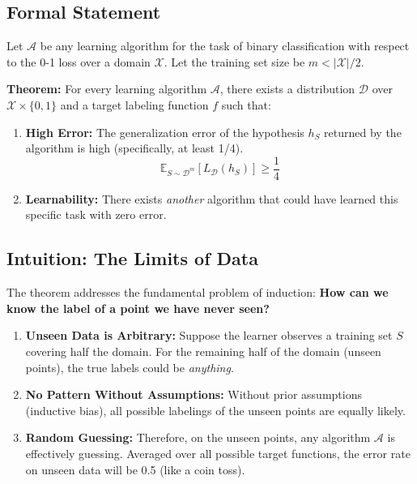 \documentclass[
  italian,
  11pt,
]{article}
\providecommand{\tightlist}{%
  \setlength{\itemsep}{0pt}\setlength{\parskip}{0pt}}
\begin{document}
\subsection{Formal Statement}\label{formal-statement}

Let \(\mathcal{A}\) be any learning algorithm for the task of binary
classification with respect to the 0-1 loss over a domain
\(\mathcal{X}\). Let the training set size be \(m < |\mathcal{X}|/2\).

\textbf{Theorem:} For every learning algorithm \(\mathcal{A}\), there
exists a distribution \(\mathcal{D}\) over
\(\mathcal{X} \times \{0,1\}\) and a target labeling function \(f\) such
that:

\begin{enumerate}
\def\labelenumi{\arabic{enumi}.}
\tightlist
\item
  \textbf{High Error:} The generalization error of the hypothesis
  \(h_S\) returned by the algorithm is high (specifically, at least
  1/4).
  \[ \mathbb{E}_{S \sim \mathcal{D}^m} [L_{\mathcal{D}}(h_S)] \geq \frac{1}{4} \]
\item
  \textbf{Learnability:} There exists \emph{another} algorithm that
  could have learned this specific task with zero error.
\end{enumerate}

\subsection{Intuition: The Limits of
Data}\label{intuition-the-limits-of-data}

The theorem addresses the fundamental problem of induction: \textbf{How
can we know the label of a point we have never seen?}

\begin{enumerate}
\def\labelenumi{\arabic{enumi}.}
\tightlist
\item
  \textbf{Unseen Data is Arbitrary:} Suppose the learner observes a
  training set \(S\) covering half the domain. For the remaining half of
  the domain (unseen points), the true labels could be \emph{anything}.
\item
  \textbf{No Pattern Without Assumptions:} Without prior assumptions
  (inductive bias), all possible labelings of the unseen points are
  equally likely.
\item
  \textbf{Random Guessing:} Therefore, on the unseen points, any
  algorithm \(\mathcal{A}\) is effectively guessing. Averaged over all
  possible target functions, the error rate on unseen data will be 0.5
  (like a coin toss).
\end{enumerate}
\end{document}

